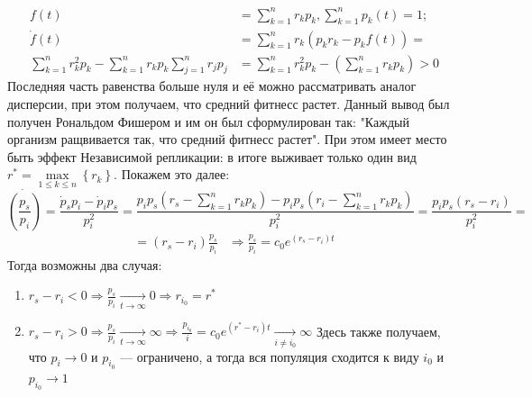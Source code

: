 \begin{equation*}
	\begin{array}{rl}
		f(t) &= \sum_{k=1}^{n}r_{k}p_{k}, \sum_{k=1}^{n}p_{k}(t) = 1;\\
		\dot{f}(t) &= \sum_{k=1}^{n}r_{k}\left(p_{k}r_{k} - p_{k}f(t)\right)=\\
		\sum_{k=1}^{n}r_{k}^{2}p_{k} - \sum_{k=1}^{n}r_{k}p_{k} \sum_{j=1}^{n}r_{j}p_{j} &= \sum_{k=1}^{n}r_{k}^{2}p_{k} - \left(\sum_{k=1}^{n}r_{k}p_{k}\right) > 0
 	\end{array}
\end{equation*}
Последняя часть равенства больше нуля и её можно рассматривать аналог дисперсии, при этом получаем, что средний фитнесс растет. Данный вывод был получен Рональдом Фишером и им он был сформулирован так: "Каждый организм ращвивается так, что средний фитнесс растет".
При этом имеет место быть эффект Независимой репликации: в итоге выживает только один вид $r^{*} = \max\limits_{1 \leqslant k \leqslant n}{\left\lbrace r_{k} \right\rbrace}$. Покажем это далее:
\begin{equation*}
	\dot{\left( \frac{p_{s}}{p_{i}} \right)} = \frac{\dot{p}_{s}p_{i} - \dot{p}_i p_{s}}{p_{i}^{2}} = \frac{p_{i}p_{s} \left( r_{s} - \sum_{k=1}^{n} r_{k}p_{k} \right) - p_{i}p_{s} \left( r_{i} - \sum_{k=1}^{n} r_{k}p_{k} \right) }{p_{i}^{2}} = \frac{p_{i}p_{s}\left(r_{s} - r_{i}\right)}{p_{i}^{2}}=
\end{equation*}
\begin{equation*}
\begin{array}{lr}
	= \displaystyle \left(r_{s} - r_{i} \right) \frac{p_{s}}{p_{i}} &\displaystyle \Rightarrow \frac{p_{s}}{p_{i}} = c_{0}e^{\left(r_{s} - r_{i} \right) t}
	\end{array}
\end{equation*}
Тогда возможны два случая:
\begin{enumerate}
	\item \hfill $
		r_{s} - r_{i} < 0 \Rightarrow \frac{p_{s}}{p_{i}} \underset{t\rightarrow \infty}{\longrightarrow} 0 \Rightarrow r_{i_0}=r^{*}$ \hfill \null
	\item \hfill $
		r_{s} - r_{i} > 0 \Rightarrow \frac{p_{s}}{p_{i}} \underset{t\rightarrow \infty}{\longrightarrow} \infty \Rightarrow \frac{p_{i_0}}{i} = c_{0}e^{\left(r^{*} - r_{i}\right)t}\underset{i \neq i_{0}}{\longrightarrow} \infty $ \hfill \null
		Здесь также получаем, что $p_i \rightarrow 0$ и $p_{i_0}$ --- ограничено, а тогда вся популяция сходится к виду $i_0$ и $p_{i_0} \rightarrow 1$ 
\end{enumerate}
